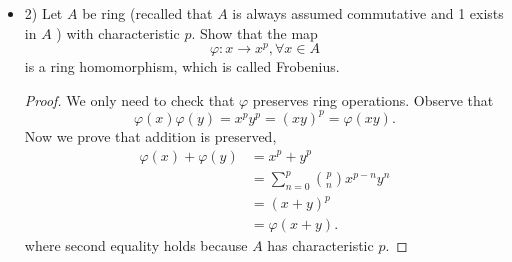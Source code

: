 \begin{itemize}
\item 2) Let $A$ be ring (recalled that $A$ is always assumed commutative and 1 exists in $A$ ) with characteristic $p$. Show that the map
\[
\varphi: x \rightarrow x^p, \forall x \in A
\]
is a ring homomorphism, which is called Frobenius.
\begin{proof}
	We only need to check that $\varphi$ preserves ring operations. Observe that
	\[
		\varphi(x)\varphi(y) = x^p y^p = (xy)^p = \varphi(xy)
	.\] 
	Now we prove that addition is preserved,
	\begin{align*}
		\varphi(x)+\varphi(y) &= x^p + y^p \\
				      &= \sum_{n=0}^{p} \binom{p}{n} x^{p - n} y^{n} \\
				      &= (x+y)^p \\
				      &= \varphi(x + y)
	.\end{align*}
	where second equality holds because $A$ has characteristic $p$.
\end{proof}

\end{itemize}

